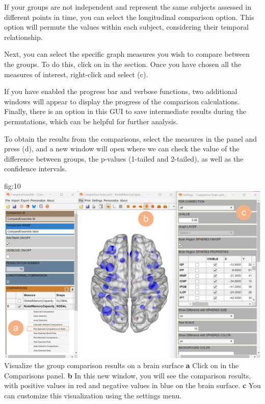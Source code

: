 \documentclass[justified]{tufte-handout}
\begin{document}
If your groups are not independent and represent the same subjects assessed in different points in time, you can select the longitudinal comparison option. This option will permute the values within each subject, considering their temporal relationship.

Next, you can select the specific graph measures you wish to compare between the groups. To do this, click on  in the  section. Once you have chosen all the measures of interest, right-click and select  (c).

If you have enabled the progress bar and verbose functions, two additional windows will appear to display the progress of the comparison calculations. Finally, there is an option in this GUI to save intermediate results during the permutations, which can be helpful for further analysis.

To obtain the results from the comparisons, select the measures in the  panel and press  ({d}), and a new window will open where we can check the value of the difference between groups, the p-values (1-tailed and 2-tailed), as well as the confidence intervals.

{fig:10}
{
	\includegraphics{fig10.jpg}
}
{Visualize the group comparison results on a brain surface}
{
	{\bf a} Click on  in the Comparisons panel. 
	{\bf b} In this new window, you will see the comparison results, with positive values in red and negative values in blue on the brain surface.
	{\bf c} You can customize this visualization using the settings menu.
}

\end{document}
